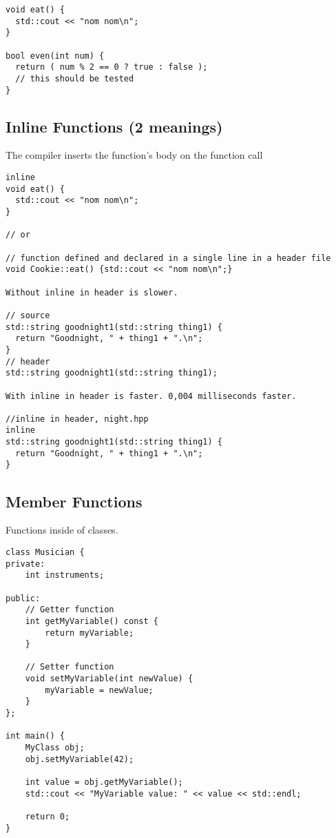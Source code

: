 \begin{verbatim}
void eat() {
  std::cout << "nom nom\n";
}

bool even(int num) {
  return ( num % 2 == 0 ? true : false );
  // this should be tested
}
\end{verbatim}

\subsection{Inline Functions (2 meanings)}

The compiler inserts the function’s body on the function call

\begin{verbatim}
inline 
void eat() {
  std::cout << "nom nom\n";
}

// or

// function defined and declared in a single line in a header file
void Cookie::eat() {std::cout << "nom nom\n";}

Without inline in header is slower.

// source
std::string goodnight1(std::string thing1) {
  return "Goodnight, " + thing1 + ".\n";
}
// header
std::string goodnight1(std::string thing1);

With inline in header is faster. 0,004 milliseconds faster.

//inline in header, night.hpp
inline
std::string goodnight1(std::string thing1) {
  return "Goodnight, " + thing1 + ".\n";
}
\end{verbatim}

\subsection{Member Functions}

Functions inside of classes.

\begin{verbatim}
class Musician {
private:
    int instruments;

public:
    // Getter function
    int getMyVariable() const {
        return myVariable;
    }

    // Setter function
    void setMyVariable(int newValue) {
        myVariable = newValue;
    }
};

int main() {
    MyClass obj;
    obj.setMyVariable(42);

    int value = obj.getMyVariable();
    std::cout << "MyVariable value: " << value << std::endl;

    return 0;
}
\end{verbatim}

